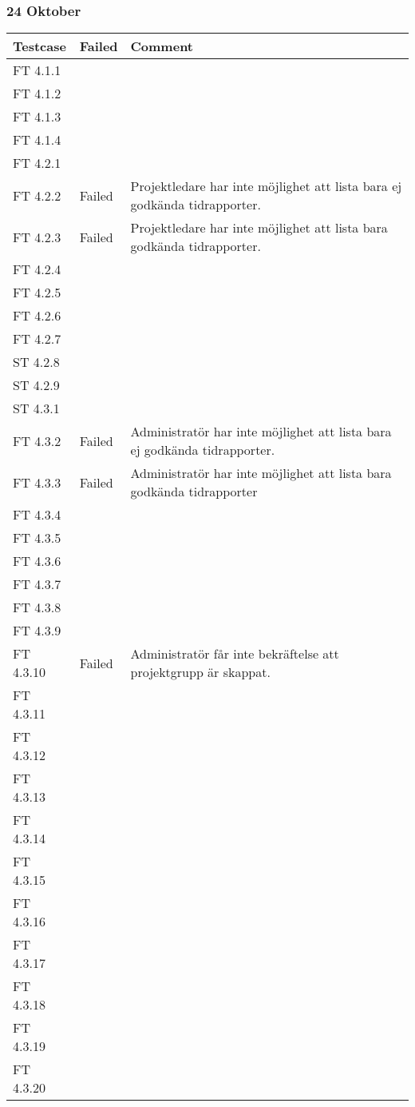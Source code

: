 \documentclass[a4paper]{article}
\begin{document}
\subsubsection{24 Oktober}
\begin{tabular}{| l | l | p{11cm} |}
\hline
Testcase &  Failed & Comment\\
\hline
FT 4.1.1 & & \\
\hline
FT 4.1.2 & & \\
\hline
FT 4.1.3 & & \\
\hline
FT 4.1.4 & & \\
\hline
FT 4.2.1 & & \\
\hline
FT 4.2.2 & Failed & Projektledare har inte möjlighet att lista bara ej godkända tidrapporter.\\
\hline
FT 4.2.3 & Failed & Projektledare har inte möjlighet att lista bara godkända tidrapporter.\\
\hline
FT 4.2.4 & & \\
\hline
FT 4.2.5 & & \\
\hline
FT 4.2.6 & & \\
\hline
FT 4.2.7 & & \\
\hline
ST 4.2.8 & & \\
\hline
ST 4.2.9 & & \\
\hline
ST 4.3.1 & & \\
\hline
FT 4.3.2 & Failed & Administratör har inte möjlighet att lista bara ej godkända tidrapporter. \\
\hline
FT 4.3.3 & Failed & Administratör har inte möjlighet att lista bara godkända tidrapporter\\
\hline
FT 4.3.4 & & \\
\hline
FT 4.3.5 & & \\
\hline
FT 4.3.6 & & \\
\hline
FT 4.3.7 & & \\
\hline
FT 4.3.8 & & \\
\hline
FT 4.3.9 & & \\
\hline
FT 4.3.10 & Failed & Administratör får inte bekräftelse att projektgrupp är skappat. \\
\hline
FT 4.3.11 & & \\
\hline
FT 4.3.12 & & \\
\hline
FT 4.3.13 & & \\
\hline
FT 4.3.14 & & \\
\hline
FT 4.3.15 & & \\
\hline
FT 4.3.16 & & \\
\hline
FT 4.3.17 & & \\
\hline
FT 4.3.18 & & \\
\hline
FT 4.3.19 & & \\
\hline
FT 4.3.20 & & \\
\end{tabular}
\end{document}
